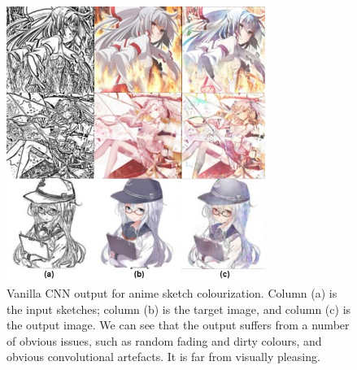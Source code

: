 \begin{figure}
    \centering
    \includegraphics[width=0.75\textwidth]{images/colorization/cnn.jpg}
    \caption{Vanilla CNN output for anime sketch colourization. Column (a) is the input sketches; column (b) is the target image, and column (c) is the output image.\cite{fransOutlineColorizationTandem2017} We can see that the output suffers from a number of obvious issues, such as random fading and dirty colours, and obvious convolutional artefacts. It is far from visually pleasing.} 
    \label{fig:colorization_cnn}
\end{figure}

